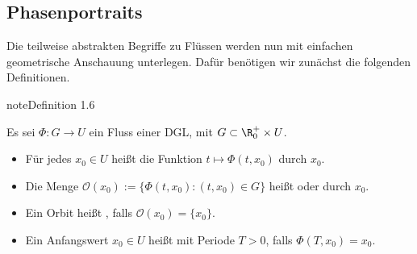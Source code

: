 \documentclass[letterpaper,10pt,english]{jupyterBook}
\begin{document}
\subsection{Phasenportraits}
\label{\detokenize{ode/fluesse:phasenportraits}}
Die teilweise abstrakten Begriffe zu Flüssen werden nun mit einfachen geometrische Anschauung unterlegen. Dafür benötigen wir zunächst die folgenden Definitionen.
\label{ode/fluesse:definition-5}
\begin{sphinxadmonition}{note}{Definition 1.6}



Es sei \(\Phi:G\rightarrow U\) ein Fluss einer DGL, mit \(G\subset \R^+_0\times U\).
\begin{itemize}
\item {} 
Für jedes \(x_0\in U\) heißt die Funktion \(t\mapsto \Phi(t, x_0)\)  durch \(x_0\).

\item {} 
Die Menge \(\mathcal{O}(x_0) := \{\Phi(t, x_0): (t, x_0)\in G\}\) heißt  oder  durch \(x_0\).

\item {} 
Ein Orbit heißt , falls \(\mathcal{O}(x_0) = \{x_0\}\).

\item {} 
Ein Anfangswert \(x_0\in U\) heißt  mit Periode \(T>0\), falls \(\Phi(T, x_0) = x_0\).

\end{itemize}
\end{sphinxadmonition}
\label{ode/fluesse:example-6}
\end{document}
